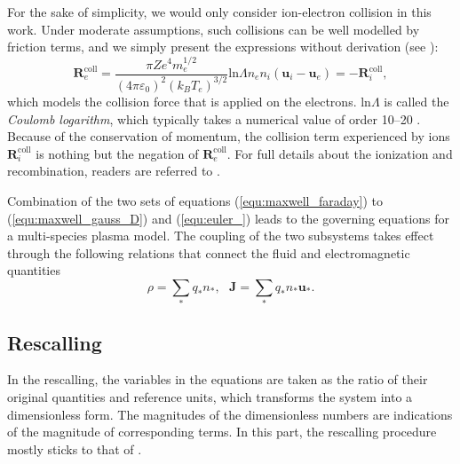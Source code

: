 \documentclass{article}
\begin{document}
For the sake of simplicity, we would only consider ion-electron collision in this work. Under moderate assumptions, such collisions can be well modelled by friction terms, and we simply present the expressions without derivation (see \citep[][sec. 5.6.2]{chen2016}):
\begin{equation} \label{equ:collision}
    \mathbf{R}_{e}^{\text{coll}} = \frac{\pi Ze^4m_e^{1/2}}{(4\pi\varepsilon_0)^2(k_BT_e)^{3/2}}\text{ln}\Lambda n_en_i(\mathbf{u}_i - \mathbf{u}_e) = - \mathbf{R}_{i}^{\text{coll}},  
\end{equation}
which models the collision force that is applied on the electrons. ln$\Lambda$ is called the \emph{Coulomb logarithm}, which typically takes a numerical value of order 10–20 . Because of the conservation of momentum, the collision term experienced by ions $\mathbf{R}_{i}^{\text{coll}}$ is nothing but the negation of $\mathbf{R}_{e}^{\text{coll}}$. For full details about the ionization and recombination, readers are referred to \cite{fuchs_2021}.  


Combination of the two sets of equations (\ref{equ:maxwell_faraday}) to (\ref{equ:maxwell_gauss_D}) and (\ref{equ:euler_}) leads to the governing equations for a multi-species plasma model. The coupling of the two subsystems takes effect through the following relations that connect the fluid and electromagnetic quantities
\begin{equation*}
    \rho = \sum_* q_*n_*, \ \ \  \mathbf{J} = \sum_* q_*n_*\mathbf{u}_*. 
\end{equation*}

\subsection{Rescalling}
In the rescalling, the variables in the equations are taken as the ratio of their original quantities and reference units, which transforms the system into a dimensionless form. The magnitudes of the dimensionless numbers are indications of the magnitude of corresponding terms. In this part, the rescalling procedure mostly sticks to that of \cite{degond_2017}.
\end{document}
